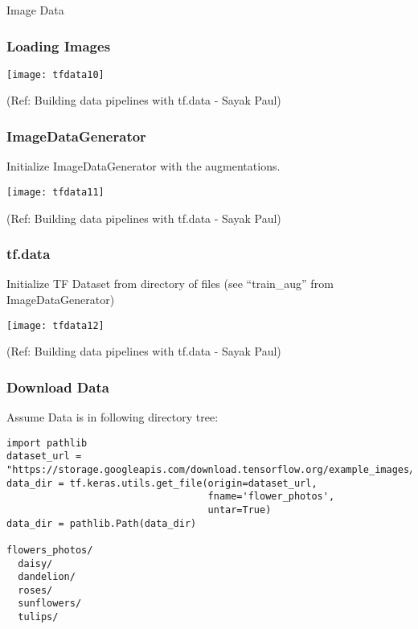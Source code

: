 \begin{frame}
  \begin{center}
    {\Large Image Data}
	
  \end{center}
\end{frame}


\begin{frame}[fragile]\frametitle{Loading Images}

\begin{center}
\texttt{[image: tfdata10]}

{\tiny (Ref: Building data pipelines with tf.data - Sayak Paul)}

\end{center}
\end{frame}

\begin{frame}[fragile]\frametitle{ImageDataGenerator}

Initialize ImageDataGenerator with the augmentations.

\begin{center}
\texttt{[image: tfdata11]}

{\tiny (Ref: Building data pipelines with tf.data - Sayak Paul)}

\end{center}
\end{frame}

\begin{frame}[fragile]\frametitle{tf.data}

Initialize TF Dataset from directory of files (see ``train\_aug'' from ImageDataGenerator)

\begin{center}
\texttt{[image: tfdata12]}

{\tiny (Ref: Building data pipelines with tf.data - Sayak Paul)}

\end{center}
\end{frame}

\begin{frame}[fragile]\frametitle{Download Data}

Assume Data is in following directory tree:

\begin{lstlisting}
import pathlib
dataset_url = "https://storage.googleapis.com/download.tensorflow.org/example_images/flower_photos.tgz"
data_dir = tf.keras.utils.get_file(origin=dataset_url, 
                                   fname='flower_photos', 
                                   untar=True)
data_dir = pathlib.Path(data_dir)

flowers_photos/
  daisy/
  dandelion/
  roses/
  sunflowers/
  tulips/
	
	
\end{lstlisting}
\end{frame}


